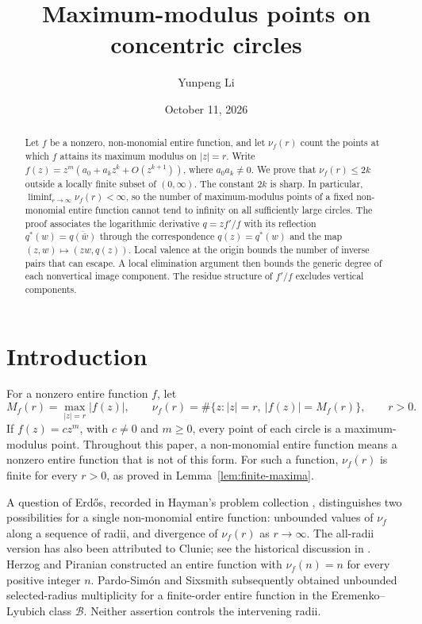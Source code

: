 \documentclass[11pt,reqno]{amsart}
\title[Maximum-modulus points on circles]{Maximum-modulus points on concentric circles}
\author{Yunpeng Li}
\date{October 11, 2026}
\theoremstyle{remark}
\numberwithin{equation}{section}
\begin{document}
\begin{abstract}
Let $f$ be a nonzero, non-monomial entire function, and let $\nu_f(r)$ count the
points at which $f$ attains its maximum modulus on $|z|=r$.
Write $f(z)=z^m(a_0+a_kz^k+O(z^{k+1}))$, where $a_0a_k\ne0$.
We prove that $\nu_f(r)\le 2k$ outside a locally finite subset of
$(0,\infty)$. The constant $2k$ is sharp. In particular,
$\liminf_{r\to\infty}\nu_f(r)<\infty$, so the number of maximum-modulus
points of a fixed non-monomial entire function cannot tend to infinity
on all sufficiently large circles. The proof associates the logarithmic
derivative $q=zf'/f$ with its reflection $q^*(w)=\overline{q(\bar w)}$
through the correspondence $q(z)=q^*(w)$ and the map
$(z,w)\mapsto(zw,q(z))$.
Local valence at the origin bounds the number of inverse pairs that can
escape. A local elimination argument then bounds the generic degree of
each nonvertical image component. The residue structure of $f'/f$
excludes vertical components.
\end{abstract}
\maketitle

\section{Introduction}
For a nonzero entire function $f$, let
\[
 M_f(r)=\max_{|z|=r}|f(z)|,
 \qquad
 \nu_f(r)=\#\{z:|z|=r,\ |f(z)|=M_f(r)\},\qquad r>0.
\]
If $f(z)=cz^m$, with $c\ne0$ and $m\ge0$, every point of each circle is
a maximum-modulus point. Throughout this paper, a non-monomial entire
function means a nonzero entire function that is not of this form.
For such a function, $\nu_f(r)$ is finite for every $r>0$, as proved
in Lemma~\ref{lem:finite-maxima}.

A question of Erd\H{o}s, recorded in Hayman's problem collection
\cite{Hayman1967}, distinguishes two possibilities for a single
non-monomial entire function: unbounded values of $\nu_f$ along a
sequence of radii, and divergence of $\nu_f(r)$ as $r\to\infty$.
The all-radii version has also been attributed to Clunie; see the
historical discussion in \cite{GlucksamPardo2024}.
Herzog and Piranian \cite{HerzogPiranian1968} constructed an entire
function with $\nu_f(n)=n$ for every positive integer $n$.
Pardo-Sim\'on and Sixsmith \cite{PardoSixsmith2026} subsequently obtained
unbounded selected-radius multiplicity for a finite-order entire
function in the Eremenko--Lyubich class $\mathcal B$.
Neither assertion controls the intervening radii.
\end{document}
